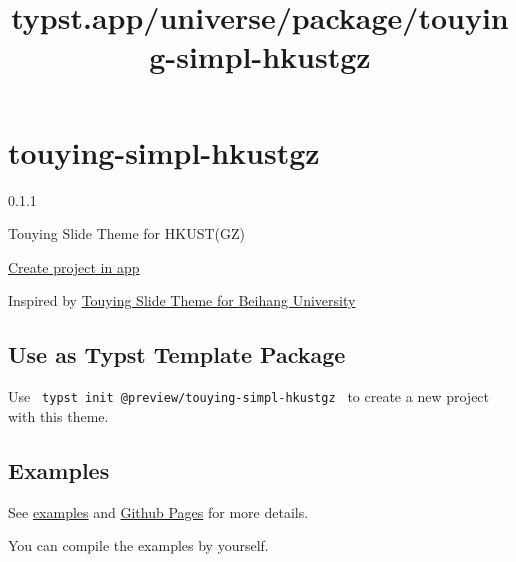 \title{typst.app/universe/package/touying-simpl-hkustgz}

\label{banner}
\label{template-thumbnail}

\section{touying-simpl-hkustgz}\label{touying-simpl-hkustgz}

{ 0.1.1 }

Touying Slide Theme for HKUST(GZ)

\href{/app?template=touying-simpl-hkustgz&version=0.1.1}{Create project
in app}

\label{readme}
Inspired by \href{https://github.com/Coekjan/touying-buaa}{Touying Slide
Theme for Beihang University}

\subsection{Use as Typst Template
Package}\label{use-as-typst-template-package}

Use \texttt{\ typst\ init\ @preview/touying-simpl-hkustgz\ } to create a
new project with this theme.

\begin{Shaded}
\begin{Highlighting}[]
\end{Highlighting}
\end{Shaded}

\subsection{Examples}\label{examples}

See
\href{https://github.com/typst/packages/raw/main/packages/preview/touying-simpl-hkustgz/0.1.1/examples}{examples}
and \href{https://exaclior.github.io/touying-simpl-hkustgz}{Github
Pages} for more details.

You can compile the examples by yourself.

\begin{Shaded}
\begin{Highlighting}[]
\end{Highlighting}
\end{Shaded}


